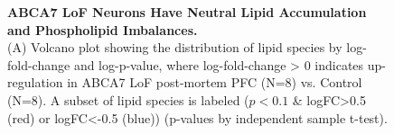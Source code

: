 \begin{figure}[ht]
    \caption{
        \textbf{ABCA7 LoF Neurons Have Neutral Lipid Accumulation and Phospholipid Imbalances.}\\[1ex]
        (A) Volcano plot showing the distribution of lipid species by log-fold-change and log-p-value, where log-fold-change > 0 indicates up-regulation in ABCA7 LoF post-mortem PFC (N=8) vs. Control (N=8). A subset of lipid species is labeled ($p<0.1$ \& logFC>0.5 (red) or logFC<-0.5 (blue)) (p-values by independent sample t-test). 
}
\end{figure}
